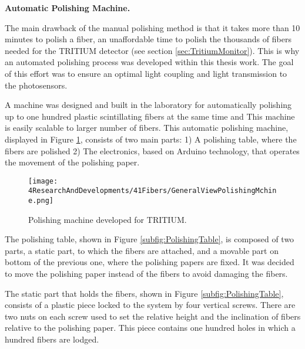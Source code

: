 \textbf{Automatic Polishing Machine.}

The main drawback of the manual polishing method is that it takes more than 10 minutes to polish a fiber, an unaffordable time to polish the thousands of fibers needed for the TRITIUM detector (see section \ref{sec:TritiumMonitor}). This is why an automated polishing process was developed within this thesis work. The goal of this effort was to ensure an optimal light coupling and light transmission to the photosensors. 



A machine was designed and built in the laboratory for automatically polishing up to one hundred plastic scintillating fibers at the same time and This machine is easily scalable to larger number of fibers. This automatic polishing machine, displayed in Figure \ref{fig:GeneralViewPolishingMachine}, consists of two main parts: 1) A polishing table, where the fibers are polished 2) The electronics, based on Arduino technology, that operates the movement of the polishing paper.

\begin{figure}[h]
\centering
\texttt{[image: 4ResearchAndDevelopments/41Fibers/GeneralViewPolishingMchine.png]}
\caption{Polishing machine developed for TRITIUM.\label{fig:GeneralViewPolishingMachine}}
\end{figure}

The polishing table, shown in Figure \ref{subfig:PolishingTable}, is composed of two parts, a static part, to which the fibers are attached, and a movable part on bottom of the previous one, where the polishing papers are fixed. It was decided to move the polishing paper instead of the fibers to avoid damaging the fibers.

The static part that holds the fibers, shown in Figure \ref{subfig:PolishingTable}, consists of a plastic piece locked to the system by four vertical screws. There are two nuts on each screw used to set the relative height and the inclination of fibers relative to the polishing paper. This piece contains one hundred holes in which a hundred fibers are lodged. 

